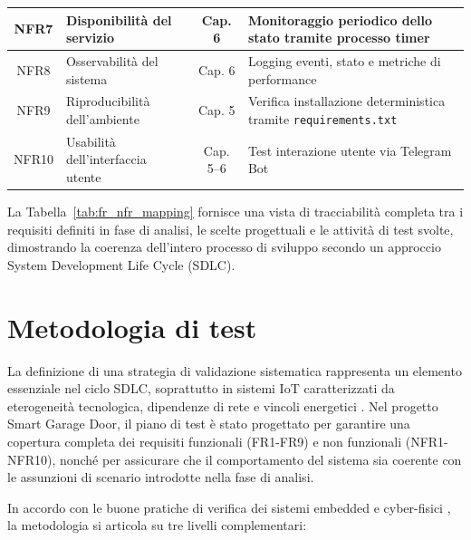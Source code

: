 \begin{table}[H]
\begin{tabular}{|c|p{4.2cm}|c|p{5.2cm}|}
\hline
NFR7 & Disponibilità del servizio & Cap. 6 & Monitoraggio periodico dello stato tramite processo timer \\
\hline
NFR8 & Osservabilità del sistema & Cap. 6 & Logging eventi, stato e metriche di performance \\
\hline
NFR9 & Riproducibilità dell’ambiente & Cap. 5 & Verifica installazione deterministica tramite \texttt{requirements.txt} \\
\hline
NFR10 & Usabilità dell’interfaccia utente & Cap. 5–6 & Test interazione utente via Telegram Bot \\
\hline
\end{tabular}
\end{table}


La Tabella~\ref{tab:fr_nfr_mapping} fornisce una vista di tracciabilità completa tra i requisiti definiti in fase di analisi, le scelte progettuali e le attività di test svolte, dimostrando la coerenza dell’intero processo di sviluppo secondo un approccio System Development Life Cycle (SDLC).

\section{Metodologia di test}
La definizione di una strategia di validazione sistematica rappresenta un elemento essenziale nel ciclo SDLC, soprattutto in sistemi IoT caratterizzati da eterogeneità tecnologica, dipendenze di rete e vincoli energetici \cite{Pressman2019, Tang2022}. Nel progetto Smart Garage Door, il piano di test è stato progettato per garantire una copertura completa dei requisiti funzionali (FR1-FR9) e non funzionali (NFR1-NFR10), nonché per assicurare che il comportamento del sistema sia coerente con le assunzioni di scenario introdotte nella fase di analisi.

In accordo con le buone pratiche di verifica dei sistemi embedded e cyber-fisici \cite{Chung2020, Lee2015}, la metodologia si articola su tre livelli complementari:

